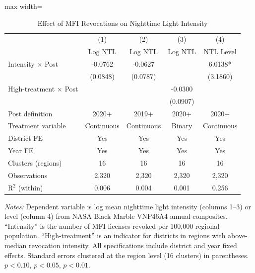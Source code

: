 \begin{table}[htbp]
\centering
\caption{Effect of MFI Revocations on Nighttime Light Intensity}
\label{tab:main}
\begin{adjustbox}{max width=\textwidth}
\begin{tabular}{lcccc}
\toprule
 & (1) & (2) & (3) & (4) \\
 & Log NTL & Log NTL & Log NTL & NTL Level \\
\midrule
Intensity $\times$ Post & -0.0762 & -0.0627 & & 6.0138* \\
 & (0.0848) & (0.0787) & & (3.1860) \\
\addlinespace
High-treatment $\times$ Post & & & -0.0300 & \\
 & & & (0.0907) & \\
\addlinespace
\midrule
Post definition & 2020+ & 2019+ & 2020+ & 2020+ \\
Treatment variable & Continuous & Continuous & Binary & Continuous \\
District FE & Yes & Yes & Yes & Yes \\
Year FE & Yes & Yes & Yes & Yes \\
Clusters (regions) & 16 & 16 & 16 & 16 \\
Observations & 2,320 & 2,320 & 2,320 & 2,320 \\
R$^2$ (within) & 0.006 & 0.004 & 0.001 & 0.256 \\
\bottomrule
\end{tabular}
\end{adjustbox}
\par\vspace{0.3em}
{\footnotesize \textit{Notes:} Dependent variable is log mean nighttime light intensity (columns 1--3) or level (column 4) from NASA Black Marble VNP46A4 annual composites. ``Intensity'' is the number of MFI licenses revoked per 100,000 regional population. ``High-treatment'' is an indicator for districts in regions with above-median revocation intensity. All specifications include district and year fixed effects. Standard errors clustered at the region level (16 clusters) in parentheses. \sym{*} $p<0.10$, \sym{**} $p<0.05$, \sym{***} $p<0.01$.
}
\end{table}

